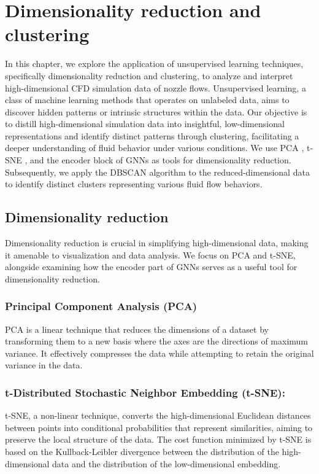 \chapter{Dimensionality reduction and clustering}
\label{chap:cluster}
In this chapter, we explore the application of unsupervised learning techniques, specifically dimensionality reduction and clustering, to analyze and interpret high-dimensional CFD simulation data of nozzle flows. Unsupervised learning, a class of machine learning methods that operates on unlabeled data, aims to discover hidden patterns or intrinsic structures within the data. Our objective is to distill high-dimensional simulation data into insightful, low-dimensional representations and identify distinct patterns through clustering, facilitating a deeper understanding of fluid behavior under various conditions. We use \gls{PCA} \cite{pearson1901pca}, \gls{t-SNE} \cite{vandermaaten2008tsne}, and the encoder block of GNNs as tools for dimensionality reduction. Subsequently, we apply the \gls{DBSCAN} algorithm \cite{ester1996dbscan} to the reduced-dimensional data to identify distinct clusters representing various fluid flow behaviors.
\section{Dimensionality reduction}
Dimensionality reduction is crucial in simplifying high-dimensional data, making it amenable to visualization and data analysis. We focus on PCA and t-SNE, alongside examining how the encoder part of GNNs serves as a useful tool for dimensionality reduction.
\subsection{Principal Component Analysis (PCA)}
PCA is a linear technique that reduces the dimensions of a dataset by transforming them to a new basis where the axes are the directions of maximum variance. It effectively compresses the data while attempting to retain the original variance in the data.

\subsection{t-Distributed Stochastic Neighbor Embedding (t-SNE):}
t-SNE, a non-linear technique, converts the high-dimensional Euclidean distances between points into conditional probabilities that represent similarities, aiming to preserve the local structure of the data. The cost function minimized by t-SNE is based on the Kullback-Leibler divergence \cite{csis} between the distribution of the high-dimensional data and the distribution of the low-dimensional embedding.
